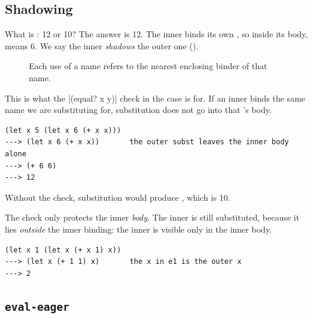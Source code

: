 \subsection{Shadowing}

What is : 12 or 10? The answer is 12. The inner  binds its own , so inside its body,  means 6. We say the inner  \emph{shadows} the outer one ().

\begin{figure}[htbp]
\centering
{}
\caption{Each use of a name refers to the nearest enclosing binder of that name.}
\label{fig:shadow}
\end{figure}

This is what the \rkt|(equal? x y)| check in the  case is for. If an inner  binds the same name we are substituting for, substitution does not go into that 's body.
\begin{lstlisting}[style=repl]
(let x 5 (let x 6 (+ x x)))
---> (let x 6 (+ x x))       the outer subst leaves the inner body alone
---> (+ 6 6)
---> 12
\end{lstlisting}
Without the check, substitution would produce , which is 10.

The check only protects the inner \emph{body}. The inner  is still substituted, because it lies \emph{outside} the inner binding: the inner  is visible only in the inner body.
\begin{lstlisting}[style=repl]
(let x 1 (let x (+ x 1) x))
---> (let x (+ 1 1) x)       the x in e1 is the outer x
---> 2
\end{lstlisting}

\subsection{\texttt{eval-eager}}

